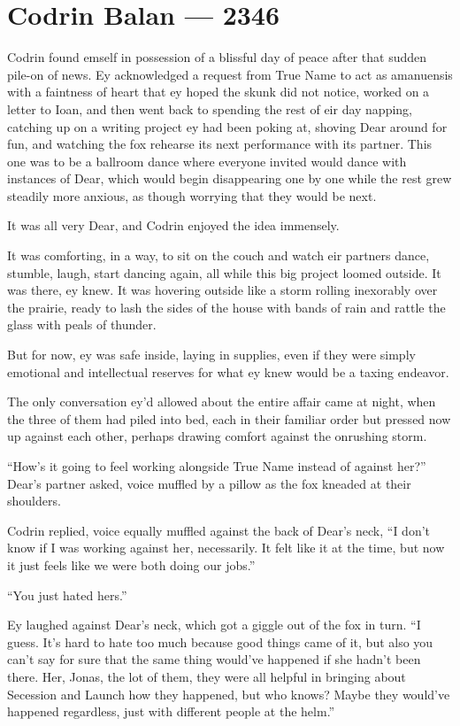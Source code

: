 \hypertarget{codrin-balan-2346}{%
\chapter{Codrin Balan — 2346}\label{codrin-balan-2346}}

Codrin found emself in possession of a blissful day of peace after that sudden pile-on of news. Ey acknowledged a request from True Name to act as amanuensis with a faintness of heart that ey hoped the skunk did not notice, worked on a letter to Ioan, and then went back to spending the rest of eir day napping, catching up on a writing project ey had been poking at, shoving Dear around for fun, and watching the fox rehearse its next performance with its partner. This one was to be a ballroom dance where everyone invited would dance with instances of Dear, which would begin disappearing one by one while the rest grew steadily more anxious, as though worrying that they would be next.

It was all very Dear, and Codrin enjoyed the idea immensely.

It was comforting, in a way, to sit on the couch and watch eir partners dance, stumble, laugh, start dancing again, all while this big project loomed outside. It was there, ey knew. It was hovering outside like a storm rolling inexorably over the prairie, ready to lash the sides of the house with bands of rain and rattle the glass with peals of thunder.

But for now, ey was safe inside, laying in supplies, even if they were simply emotional and intellectual reserves for what ey knew would be a taxing endeavor.

The only conversation ey'd allowed about the entire affair came at night, when the three of them had piled into bed, each in their familiar order but pressed now up against each other, perhaps drawing comfort against the onrushing storm.

``How's it going to feel working alongside True Name instead of against her?'' Dear's partner asked, voice muffled by a pillow as the fox kneaded at their shoulders.

Codrin replied, voice equally muffled against the back of Dear's neck, ``I don't know if I was working against her, necessarily. It felt like it at the time, but now it just feels like we were both doing our jobs.''

``You just hated hers.''

Ey laughed against Dear's neck, which got a giggle out of the fox in turn. ``I guess. It's hard to hate too much because good things came of it, but also you can't say for sure that the same thing would've happened if she hadn't been there. Her, Jonas, the lot of them, they were all helpful in bringing about Secession and Launch how they happened, but who knows? Maybe they would've happened regardless, just with different people at the helm.''

